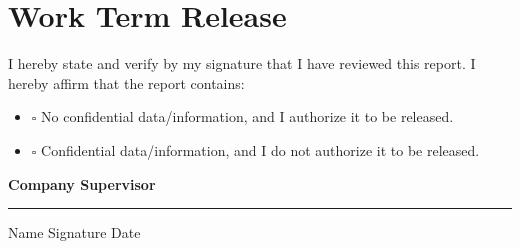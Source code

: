 
\chapter*{Work Term Release}
\thispagestyle{plain}
\vspace{0.4cm}
\large \noindent
I hereby state and verify by my signature that I have reviewed this report. I hereby affirm that the report contains: \\
\vspace{0.2cm}

\begin{itemize}
    \item $\square$ No confidential data/information, and I authorize it to be released. \\
    \vspace{0.3cm}
    \item $\square$ Confidential data/information, and I do not authorize it to be released. \\
\end{itemize}

\vspace{0.2cm}
\textbf{\large{Company Supervisor}}
\normalsize
\vspace{1cm}

\vspace{0.2cm}
\hrule
\vspace{0.2cm}
\noindent Name \hspace{7cm} Signature \hspace{3cm} Date
